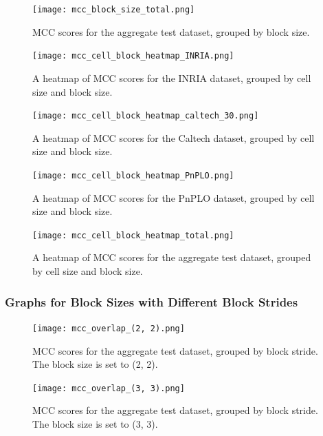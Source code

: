 \begin{figure}
    \centering
    \texttt{[image: mcc\_block\_size\_total.png]}
    \caption{
        MCC scores for the aggregate test dataset, grouped by block size.
    }
    \label{fig:block_size_total}
\end{figure}


\begin{figure}
    \centering
    \texttt{[image: mcc\_cell\_block\_heatmap\_INRIA.png]}
    \caption{
        A heatmap of MCC scores for the INRIA dataset, grouped by cell size and block size.
    }
    \label{fig:cell_block_heatmap_inria}
\end{figure}

\begin{figure}
    \centering
    \texttt{[image: mcc\_cell\_block\_heatmap\_caltech\_30.png]}
    \caption{
        A heatmap of MCC scores for the Caltech dataset, grouped by cell size and block size.
    }
    \label{fig:cell_block_heatmap_caltech}
\end{figure}

\begin{figure}
    \centering
    \texttt{[image: mcc\_cell\_block\_heatmap\_PnPLO.png]}
    \caption{
        A heatmap of MCC scores for the PnPLO dataset, grouped by cell size and block size.
    }
\end{figure}

\begin{figure}
    \centering
    \texttt{[image: mcc\_cell\_block\_heatmap\_total.png]}
    \caption{
        A heatmap of MCC scores for the aggregate test dataset, grouped by cell size and block size.
    }
    \label{fig:cell_block_heatmap_total}
\end{figure}

\subsubsection{Graphs for Block Sizes with Different Block Strides}

\begin{figure}
    \centering
    \texttt{[image: mcc\_overlap\_(2, 2).png]}
    \caption{
        MCC scores for the aggregate test dataset, grouped by block stride. The block size is set to (2, 2).
    }
    \label{fig:overlap_2_2}
\end{figure}

\begin{figure}
    \centering
    \texttt{[image: mcc\_overlap\_(3, 3).png]}
    \caption{
        MCC scores for the aggregate test dataset, grouped by block stride. The block size is set to (3, 3).
    }
    \label{fig:overlap_3_3}
\end{figure}

